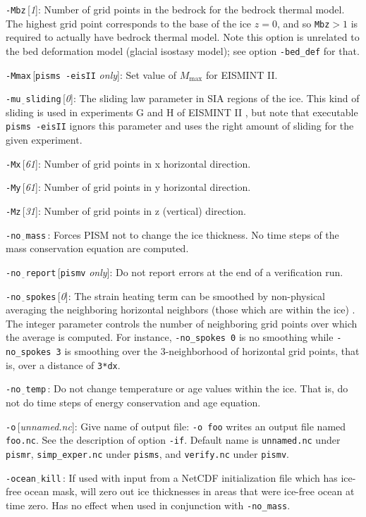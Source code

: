 \documentclass[11pt,final]{amsart}
\renewcommand{\t}[1]{\texttt{#1}}
\newcommand{\rawopt}[1]{\vspace{1mm}\noindent \large\texttt{-#1}\normalsize}
\newcommand{\opt}[1]{\rawopt{#1}\,:\quad}
\newcommand{\optdef}[2]{\rawopt{#1}\,[\textsl{#2}]:\quad}
\newcommand{\optrestrict}[2]{\rawopt{#1}\,[\texttt{#2} \textsl{only}]:\quad}
\newcommand{\und}{$\underline{\,\,\,}$}
\begin{document}
\optdef{Mbz}{1}  Number of grid points in the bedrock for the bedrock thermal model.  The highest grid point corresponds to the base of the ice $z=0$, and so \t{Mbz}$>1$ is required to actually have bedrock thermal model.  Note this option is unrelated to the bed deformation model (glacial isostasy model); see option \verb|-bed_def| for that.

\optrestrict{Mmax}{pisms -eisII}  Set value of $M_{\text{max}}$ for EISMINT II.

\optdef{mu\und sliding}{0}  The sliding law parameter in SIA regions of the ice.  This kind of sliding is used in experiments G and H of EISMINT II \cite{EISMINT00}, but note that executable \verb|pisms -eisII| ignors this parameter and uses the right amount of sliding for the given experiment.

\optdef{Mx}{61}  Number of grid points in x horizontal direction.

\optdef{My}{61}  Number of grid points in y horizontal direction.

\optdef{Mz}{31}  Number of grid points in z (vertical) direction.

\opt{no\und mass}  Forces PISM not to change the ice thickness.  No time steps of the mass conservation equation are computed.

\optrestrict{no\und report}{pismv}  Do not report errors at the end of a verification run.

\optdef{no\und spokes}{0}  The strain heating term can be smoothed by non-physical averaging the neighboring horizontal neighbors (those which are within the ice) \cite{BBL}.  The integer parameter controls the number of neighboring grid points over which the average is computed.  For instance, \verb|-no_spokes 0| is no smoothing while \verb|-no_spokes 3| is smoothing over the 3-neighborhood of horizontal grid points, that is, over a distance of \verb|3*dx|.

\opt{no\und temp}  Do not change temperature or age values within the ice.  That is, do not do time steps of energy conservation and age equation.

\optdef{o}{unnamed.nc} Give name of output file: \verb|-o foo| writes an output file named \verb|foo.nc|.  See the description of option \verb|-if|.  Default name is \verb|unnamed.nc| under \verb|pismr|, \verb|simp_exper.nc| under \verb|pisms|, and \verb|verify.nc| under \verb|pismv|.

\opt{ocean\und kill}  If used with input from a NetCDF initialization file which has ice-free ocean mask, will zero out ice thicknesses in areas that were ice-free ocean at time zero.  Has no effect when used in conjunction with \verb|-no_mass|.
\end{document}
